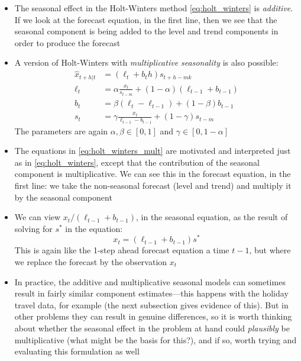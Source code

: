 \documentclass{article}
\begin{document}
\begin{itemize}
\item The seasonal effect in the Holt-Winters method \eqref{eq:holt_winters} is
  \emph{additive}. If we look at the forecast equation, in the first line, then
  we see that the seasonal component is being added to the level and trend  
  components in order to produce the forecast 

\item A version of Holt-Winters with \emph{multiplicative seasonality} is also 
  possible: 
  \begin{equation}
  \label{eq:holt_winters_mult}
  \begin{aligned}
  \hat{x}_{t+h | t} &= (\ell_t + b_t h) s_{t+h-mk} \\   
  \ell_t &= \alpha \frac{x_t}{s_{t-m}} + (1-\alpha) (\ell_{t-1} + b_{t-1}) \\ 
  b_t &= \beta (\ell_t - \ell_{t-1}) + (1-\beta) b_{t-1} \\
  s_t &= \gamma \frac{x_t}{\ell_{t-1} - b_{t-1}} + (1-\gamma) s_{t-m} 
  \end{aligned}
  \end{equation}
  The parameters are again $\alpha, \beta \in [0,1]$ and $\gamma \in [0,
  1-\alpha]$  

\item The equations in \eqref{eq:holt_winters_mult} are motivated and
  interpreted just as in \eqref{eq:holt_winters}, except that the contribution 
  of the seasonal component is multiplicative. We can see this in the forecast
  equation, in the first line: we take the non-seasonal forecast (level and
  trend) and multiply it by the seasonal component  

\item We can view $x_t / (\ell_{t-1} +  b_{t-1})$, in the seasonal equation, as
  the result of solving for $s^*$ in the equation: 
  \[
  x_t = (\ell_{t-1} + b_{t-1}) s^*
  \]
  This is again like the 1-step ahead forecast equation a time $t-1$, but where
  we replace the forecast  by the observation $x_t$

\item In practice, the additive and multiplicative seasonal models can sometimes
  result in fairly similar component estimates---this happens with the holiday
  travel data, for example (the next subsection gives evidence of this). But in
  other problems they can result in genuine differences, so it is worth thinking
  about whether the seasonal effect in the problem at hand could
  \emph{plausibly} be multiplicative (what might be the basis for this?), and if
  so, worth trying and evaluating this formulation as well 
\end{itemize}
\end{document}
